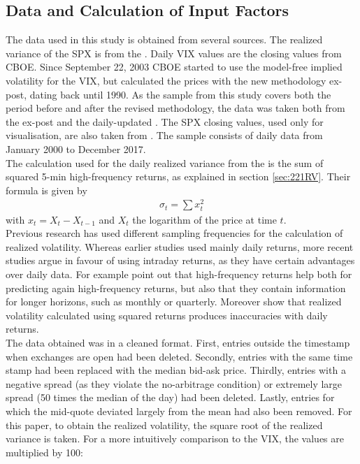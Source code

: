 \subsection{Data and Calculation of Input Factors}\label{sec:41Data}
The data used in this study is obtained from several sources. The realized variance of the \ac{SPX} is from the \textcite{Oxford:RV}. Daily \ac{VIX} values are the closing values from \ac{CBOE}. Since September 22, 2003 \ac{CBOE} started to use the model-free implied volatility for the \ac{VIX}, but calculated the prices with the new methodology ex-post, dating back until 1990. As the sample from this study covers both the period before and after the revised methodology, the data was taken both from the ex-post \textcite{CBOE:old} and the daily-updated \textcite{CBOE:new}. The \ac{SPX} closing values, used only for visualisation, are also taken from \textcite{SandP}. The sample consists of daily data from January 2000 to December 2017. \\
The calculation used for the daily realized variance from the \textcite{Oxford:RV} is the sum of squared 5-min high-frequency returns, as explained in section \ref{sec:221RV}. Their formula is given by 
\begin{align}
\sigma_{t} = \sum x_{t}^{2}
\end{align}
with $x_{t} = X_{t} - X_{t-1}$ and $X_{t}$ the logarithm of the price at time $t$. \\%
Previous research has used different sampling frequencies for the calculation of realized volatility. Whereas earlier studies used mainly daily returns, more recent studies argue in favour of using intraday returns, as they have certain advantages over daily data. For example \textcite{andersen2003} point out that high-frequency returns help both for predicting again high-frequency returns, but also that they contain information for longer horizons, such as monthly or quarterly. Moreover \textcite{andersen1998} show that realized volatility calculated using squared returns produces inaccuracies with daily returns.\\
The data obtained was in a cleaned format. First, entries outside the timestamp when exchanges are open had been deleted. Secondly, entries with the same time stamp had been replaced with the median bid-ask price. Thirdly, entries with a negative spread (as they violate the no-arbitrage condition) or extremely large spread (50 times the median of the day) had been deleted. Lastly, entries for which the mid-quote deviated largely from the mean had also been removed. For this paper, to obtain the realized volatility, the square root of the realized variance is taken. For a more intuitively comparison to the \ac{VIX}, the values are multiplied by 100:
